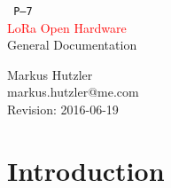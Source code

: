 \documentclass[paper=a4paper, fontsize=11pt,twoside]{scrreprt}
\newcommand*{\titleTH}{
\thispagestyle{empty}
{
\raggedleft
\vspace{8cm}
\texttt{ \projectNumber-\reportNumber}\\
\vspace{0.5cm}
\textcolor{red}{\Huge \projectName}\\
\vspace{0.5cm}
{\Large \reportTitle}\par
\vfill
\reportAuthor\\
\reportAuthorMail\\
\vspace{0.5cm}
Revision: \reportRevision\\}}
\begin{document}
\newcommand{\projectNumber}{P-}
\newcommand{\projectName}{LoRa Open Hardware}
\newcommand{\projectOwner}{}

\newcommand{\reportNumber}{7}
\newcommand{\reportRevision}{2016-06-19}
\newcommand{\reportTitle}{General Documentation}
\newcommand{\reportAuthor}{Markus Hutzler}
\newcommand{\reportAuthorMail}{markus.hutzler@me.com}

\titleTH

\begin{versionhistory}
\end{versionhistory}

\tableofcontents

\chapter{Introduction}
\end{document}
